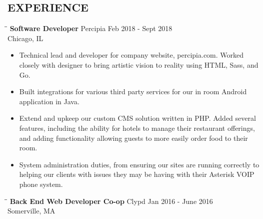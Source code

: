 \documentclass{res}
\begin{document}
 

\address{\bf  1029 W Irving Park Rd \\Chicago, IL 60613 \\(857) 407-8840 \\ ronbrz@protonmail.ch}
\begin{resume}
\section{EXPERIENCE}
\vspace{0in}
\begin{tabbing}
  \hspace{2.3in}\= \hspace{2.6in}\= \kill %
  {\bf Software Developer} \>Percipia     \> Feb 2018 - Sept 2018\\
  \>Chicago, IL
\end{tabbing}
\begin{itemize}[leftmargin= .1in] \itemsep -2pt
\item Technical lead and developer for company website, percipia.com. Worked closely
  with designer to bring artistic vision to reality using HTML, Sass, and Go.
\item Built integrations for various third party services for our in room Android application in Java.
\item Extend and upkeep our custom CMS solution written in PHP. Added several features, including
  the ability for hotels to manage their restaurant offerings, and adding functionality allowing guests to
  more easily order food to their room.
\item System administration duties, from ensuring our sites are running correctly to helping our clients
  with issues they may be having with their Asterisk VOIP phone system.
\end{itemize}
\vspace{-.2in}
\begin{tabbing}
  \hspace{2.3in}\= \hspace{2.6in}\= \kill %
  {\bf Back End Web Developer Co-op} \>Clypd     \> Jan 2016 - June 2016\\
  \>Somerville, MA
\end{tabbing}
\begin{itemize}[leftmargin= .1in] \itemsep -2pt

\end{itemize}
\end{resume}
\end{document}
